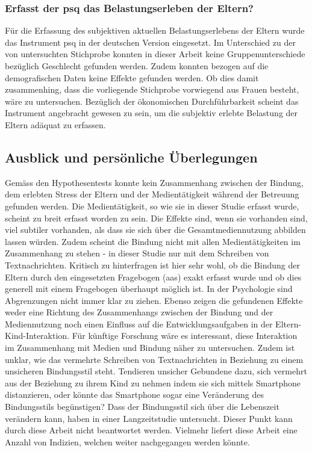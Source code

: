 \subsubsection{Erfasst der \acrshort{psq} das Belastungserleben der Eltern?}
Für die Erfassung des subjektiven aktuellen Belastungserlebens der Eltern wurde das Instrument \acrfull{psq} in der deutschen Version eingesetzt. Im Unterschied zu der von  untersuchten Stichprobe konnten in dieser Arbeit keine Gruppenunterschiede bezüglich Geschlecht gefunden werden. Zudem konnten bezogen auf die demografischen Daten keine Effekte gefunden werden. Ob dies damit zusammenhing, dass die vorliegende Stichprobe vorwiegend aus Frauen besteht, wäre zu untersuchen. Bezüglich der ökonomischen Durchführbarkeit scheint das Instrument angebracht gewesen zu sein, um die subjektiv erlebte Belastung der Eltern adäquat zu erfassen.

\subsection{Ausblick und persönliche Überlegungen} \label{sec:Ausblick}
Gemäss den Hypothesentests konnte kein Zusammenhang zwischen der Bindung, dem erlebten Stress der Eltern und der Medientätigkeit während der Betreuung gefunden werden. Die Medientätigkeit, so wie sie in dieser Studie erfasst wurde, scheint zu breit erfasst worden zu sein. Die Effekte sind, wenn sie vorhanden sind, viel subtiler vorhanden, als dass sie sich über die Gesamtmediennutzung abbilden lassen würden. Zudem scheint die Bindung nicht mit allen Medientätigkeiten im Zusammenhang zu stehen - in dieser Studie nur mit dem Schreiben von Textnachrichten. Kritisch zu hinterfragen ist hier sehr wohl, ob die Bindung der Eltern durch den eingesetzten Fragebogen (\acrshort{aas}) exakt erfasst wurde und ob dies generell mit einem Fragebogen überhaupt möglich ist. In der Psychologie sind Abgrenzungen nicht immer klar zu ziehen. Ebenso zeigen die gefundenen Effekte weder eine Richtung des Zusammenhangs zwischen der Bindung und der Mediennutzung noch einen Einfluss auf die Entwicklungsaufgaben in der Eltern-Kind-Interaktion. Für künftige Forschung wäre es interessant, diese Interaktion im Zusammenhang mit Medien und Bindung näher zu untersuchen. Zudem ist unklar, wie das vermehrte Schreiben von Textnachrichten in Beziehung zu einem unsicheren Bindungsstil steht. Tendieren unsicher Gebundene dazu, sich vermehrt aus der Beziehung zu ihrem Kind zu nehmen indem sie sich mittels Smartphone distanzieren, oder könnte das Smartphone sogar eine Veränderung des Bindungsstils begünstigen? Dass der Bindungsstil sich über die Lebenszeit verändern kann, haben  in einer Langzeitstudie untersucht. Dieser Punkt kann durch diese Arbeit nicht beantwortet werden. Vielmehr liefert diese Arbeit eine Anzahl von Indizien, welchen weiter nachgegangen werden könnte.

